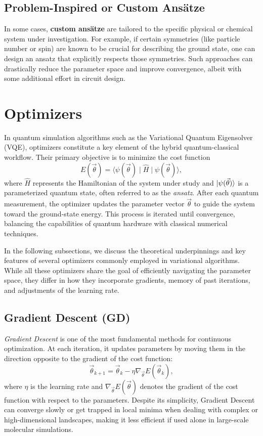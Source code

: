 \subsection{Problem-Inspired or Custom Ans\"{a}tze}
In some cases, \textbf{custom ans\"{a}tze} are tailored to the specific physical or chemical system under investigation. For example, if certain symmetries (like particle number or spin) are known to be crucial for describing the ground state, one can design an ansatz that explicitly respects those symmetries. Such approaches can drastically reduce the parameter space and improve convergence, albeit with some additional effort in circuit design.

\section{Optimizers}
\label{sec:optimizers}

In quantum simulation algorithms such as the Variational Quantum Eigensolver (VQE), optimizers constitute a key element of the hybrid quantum-classical workflow. Their primary objective is to minimize the cost function
\[
E(\vec{\theta}) = \langle \psi(\vec{\theta}) \mid \hat{H} \mid \psi(\vec{\theta}) \rangle,
\]
where \(\hat{H}\) represents the Hamiltonian of the system under study and \(\ket{\psi(\vec{\theta})}\) is a parameterized quantum state, often referred to as the \emph{ansatz}. After each quantum measurement, the optimizer updates the parameter vector \(\vec{\theta}\) to guide the system toward the ground-state energy. This process is iterated until convergence, balancing the capabilities of quantum hardware with classical numerical techniques.

In the following subsections, we discuss the theoretical underpinnings and key features of several optimizers commonly employed in variational algorithms. While all these optimizers share the goal of efficiently navigating the parameter space, they differ in how they incorporate gradients, memory of past iterations, and adjustments of the learning rate.

\subsection{Gradient Descent (GD)}
\label{subsec:gd}
\emph{Gradient Descent} is one of the most fundamental methods for continuous optimization. At each iteration, it updates parameters by moving them in the direction opposite to the gradient of the cost function:
\[
\vec{\theta}_{k+1} = \vec{\theta}_{k} 
- \eta \nabla_{\vec{\theta}} E(\vec{\theta}_{k}),
\]
where \(\eta\) is the learning rate and \(\nabla_{\vec{\theta}} E(\vec{\theta})\) denotes the gradient of the cost function with respect to the parameters. Despite its simplicity, Gradient Descent can converge slowly or get trapped in local minima when dealing with complex or high-dimensional landscapes, making it less efficient if used alone in large-scale molecular simulations.

